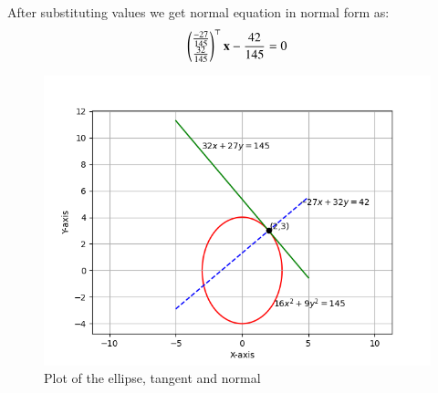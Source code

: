 \documentclass[journal]{IEEEtran}
\begin{document}
After substituting values we get normal equation in normal form as:
\begin{align}
    \begin{pmatrix}\frac{-27}{145}\\\frac{32}{145}\end{pmatrix}^\top\mathbf{x}-\frac{42}{145}=0
\end{align}


\begin{figure}[h!]
   \centering
   \includegraphics[width=0.7\linewidth]{figs/plot.png}
   \caption{Plot of the ellipse, tangent and normal}
   \label{}
\end{figure}
\end{document}
